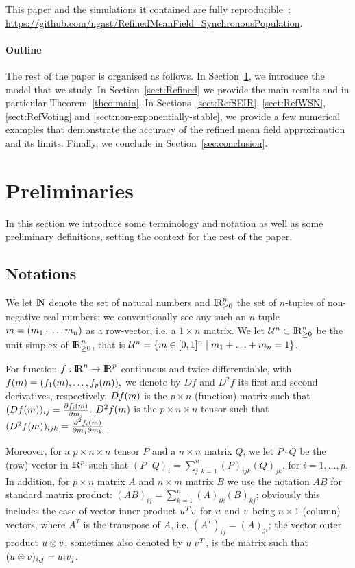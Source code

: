 \documentclass{elsarticle}
\begin{document}
This paper and the simulations it contained are fully reproducible~:
{\footnotesize\url{https://github.com/ngast/RefinedMeanField_SynchronousPopulation}}.

\paragraph*{Outline} The rest of the paper is organised as follows. In
Section~\ref{sect:preliminaries}, we introduce the model that we
study. In Section~\ref{sect:Refined} we provide the main results and
in particular Theorem~\ref{theo:main}. In Sections~\ref{sect:RefSEIR},
\ref{sect:RefWSN}, \ref{sect:RefVoting} and
\ref{sect:non-exponentially-stable}, we provide a few numerical
examples that demonstrate the accuracy of the refined mean field
approximation and its limits. Finally, we conclude in
Section~\ref{sec:conclusion}.

\section{Preliminaries}
\label{sect:preliminaries}

In this section we introduce some terminology and notation as well as
some preliminary definitions, setting the context for the rest of the
paper.


\subsection{Notations}

We let $\mathrm{I\!N}$ denote the set of natural numbers and $\mathrm{I\!R}_{\geq 0}^n$ the
set of $n$-tuples of non-negative real numbers; we conventionally see
any such an $n$-tuple $m=(m_1,\ldots,m_n)$ as a row-vector,
i.e. a $1 \times n$ matrix. We let ${\cal U}^n \subset \mathrm{I\!R}_{\geq 0}^n$ be the
unit simplex of $\mathrm{I\!R}_{\geq 0}^n$, that is
${\cal U}^n=\{m \in [0,1]^n \;|\; m_1 + \ldots +m_n =1\}$.

For function $f :\mathrm{I\!R}^n \rightarrow \mathrm{I\!R}^p$ continuous and twice
differentiable, with
$ f(m) = (f_1(m), \ldots, f_p(m)), $ we denote by $Df$
and $D^2f$ its first and second derivatives, respectively. $D f (m)$ is the
$p \times n$ (function) matrix such that
$(D f (m))_{ij} = \frac{\partial f_i(m)}{\partial m_j}$.
$D^2 f (m)$ is the $p \times n \times n$ tensor such that
$(D^2 f (m))_{ijk} = \frac{\partial^2 f_i(m)}{\partial
  m_j\partial m_k}$.

Moreover, for a $p \times n \times n$ tensor $P$ and a $n \times n$
matrix $Q$, we let $P \cdot Q$ be the (row) vector in $\mathrm{I\!R}^p$ such
that $(P \cdot Q)_i = \sum_{j,k=1}^n (P)_{ijk}(Q)_{jk}$, for
$i=1,\ldots, p$.  In addition, for $p \times n$ matrix $A$ and
$n \times m$ matrix $B$ we use the notation $AB$ for standard matrix
product: $(AB)_{ij} = \sum_{k=1}^n (A)_{ik}(B)_{kj}$; obviously this
includes the case of vector inner product $u^T v$ for
$u$ and $v$ being $n \times 1$ (column) vectors, where $A^T$
is the transpose of $A$, i.e. $(A^T)_{ij}=(A)_{ji}$; the vector outer
product $u \otimes v$, sometimes also denoted by
$u \;v^T$, is the matrix such that
$(u \otimes v)_{i,j} = u_iv_j$.
\end{document}
